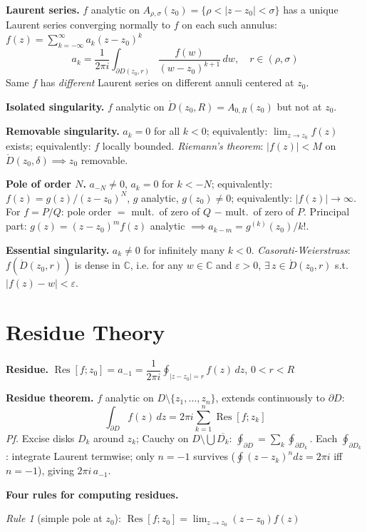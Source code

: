 \documentclass[9pt,twocolumn]{extarticle}
\newcommand{\Res}{\operatorname{Res}}
\begin{document}
\textbf{Laurent series.} $f$ analytic on $A_{\rho,\sigma}(z_0)=\{\rho<|z-z_0|<\sigma\}$
has a unique Laurent series converging normally to $f$ on each such annulus:$f(z)=\sum_{k=-\infty}^\infty a_k(z-z_0)^k$
$$a_k=\frac{1}{2\pi i}\int_{\partial D(z_0,r)}\frac{f(w)}{(w-z_0)^{k+1}}\,dw,\quad r\in(\rho,\sigma)$$
Same $f$ has \emph{different} Laurent series on different annuli centered at $z_0$.

\textbf{Isolated singularity.} $f$ analytic on $\mathring D(z_0,R)=A_{0,R}(z_0)$ but not at $z_0$.

\textbf{Removable singularity.} $a_k=0$ for all $k<0$; equivalently: $\lim_{z\to z_0}f(z)$ exists;
equivalently: $f$ locally bounded.
\textit{Riemann's theorem}: $|f(z)|<M$ on $\mathring D(z_0,\delta)\implies z_0$ removable.

\textbf{Pole of order $N$.} $a_{-N}\ne0$, $a_k=0$ for $k<-N$;\; equivalently:
$f(z)=g(z)/(z-z_0)^N$, $g$ analytic, $g(z_0)\ne0$;\; equivalently: $|f(z)|\to\infty$.
For $f=P/Q$: pole order $=$ mult.\ of zero of $Q$ $-$ mult.\ of zero of $P$.
Principal part: $g(z)=(z-z_0)^mf(z)$ analytic $\implies a_{k-m}=g^{(k)}(z_0)/k!$.

\textbf{Essential singularity.} $a_k\ne0$ for infinitely many $k<0$.
\textit{Casorati-Weierstrass}: $f(\mathring D(z_0,r))$ is dense in $\mathbb{C}$, i.e. for any $w\in\mathbb{C}$
and $\varepsilon>0$, $\exists\,z\in\mathring D(z_0,r)$ s.t. $|f(z)-w|<\varepsilon$.

\section{Residue Theory}

\textbf{Residue.} $\Res[f;z_0]=a_{-1}=\dfrac{1}{2\pi i}\oint_{|z-z_0|=r}f(z)\,dz$,\; $0<r<R$

\textbf{Residue theorem.} $f$ analytic on $D\setminus\{z_1,\dots,z_n\}$, extends continuously to $\partial D$:
$$\int_{\partial D}f(z)\,dz=2\pi i\sum_{k=1}^n\Res[f;z_k]$$
\textit{Pf.} Excise disks $D_k$ around $z_k$; Cauchy on $D\setminus\bigcup\overline{D_k}$:\; $\oint_{\partial D}=\sum_k\oint_{\partial D_k}$.\; Each $\oint_{\partial D_k}$: integrate Laurent termwise; only $n=-1$ survives ($\oint(z{-}z_k)^n dz=2\pi i$ iff $n=-1$), giving $2\pi i\,a_{-1}$.

\textbf{Four rules for computing residues.}

\textit{Rule 1} (simple pole at $z_0$):\; $\Res[f;z_0]=\lim_{z\to z_0}(z-z_0)f(z)$
\end{document}
